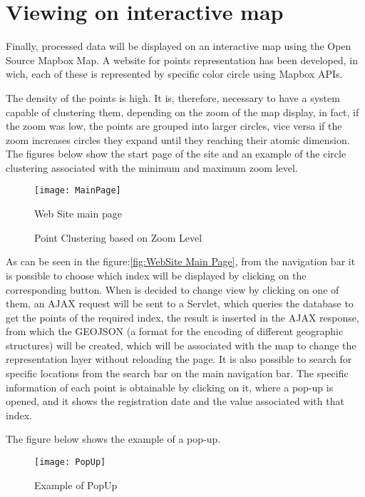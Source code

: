 \documentclass[tesi]{subfiles}
\begin{document}
\clearpage
\section{Viewing on interactive map}\label{sc:Viewing on interactive map}
Finally, processed data will be displayed on an interactive map using the Open Source Mapbox Map. A website for points representation has been developed, in wich, each of these is represented by specific color circle using Mapbox APIs.

The density of the points is high. It is, therefore, necessary to have a system capable of clustering them, depending on the zoom of the map display, in fact, if the zoom was low, the points are grouped into larger circles, vice versa if the zoom increases circles they expand until they reaching their atomic dimension.
The figures below show the start page of the site and an example of the circle clustering associated with the minimum and maximum zoom level.

\begin{figure}[H]
\centering
\texttt{[image: MainPage]}
\caption{Web Site main page}
\end{figure}\label{fig:WebSite Main Page}

\begin{figure}[H]
  \centering

  \hspace{10mm}
  \caption{Point Clustering based on Zoom Level}
  \label{fig:Point Clustering based on Zoom Level}
\end{figure}
\clearpage


As can be seen in the figure:\ref{fig:WebSite Main Page}, from the navigation bar it is possible to choose which index will be displayed by clicking on the corresponding button. When is decided to change view by clicking on one of them, an AJAX request will be sent to a Servlet, which queries the database to get the points of the required index, the result is inserted in the AJAX response, from which the GEOJSON (a format for the encoding of different geographic structures) will be created, which will be associated with the map to change the representation layer without reloading the page.
It is also possible to search for specific locations from the search bar on the main navigation bar.
The specific information of each point is obtainable by clicking on it, where a pop-up is opened, and it shows the registration date and the value associated with that index.

The figure below shows the example of a pop-up.


\begin{figure}[H]
\centering
\texttt{[image: PopUp]}
\caption{Example of PopUp}
\end{figure}\label{fig:PopUp}
\end{document}
